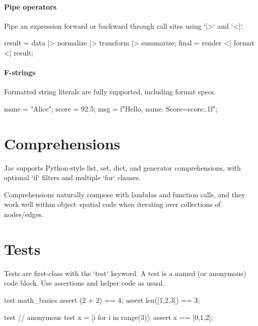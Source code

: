\paragraph{Pipe operators}

Pipe an expression forward or backward through call sites using `|>` and `<|`.

\begin{jacblock}
result = data |> normalize |> transform |> summarize;
final  = render <| format <| result;
\end{jacblock}

\paragraph{F-strings}

Formatted string literals are fully supported, including format specs.

\begin{jacblock}
name = "Alice"; score = 92.5;
msg = f"Hello, {name}. Score={score:.1f}";
\end{jacblock}

\section{Comprehensions}

Jac supports Python-style list, set, dict, and generator comprehensions, with optional `if` filters and multiple `for` clauses.


Comprehensions naturally compose with lambdas and function calls, and they work well within object–spatial code when iterating over collections of nodes/edges.

\section{Tests}

Tests are first-class with the `test` keyword. A test is a named (or anonymous) code block. Use assertions and helper code as usual.

\begin{jacblock}
test math_basics {
    assert (2 + 2) == 4;
    assert len([1,2,3]) == 3;
}

test {  // anonymous test
    x = [i for i in range(3)];
    assert x == [0,1,2];
}
\end{jacblock}

